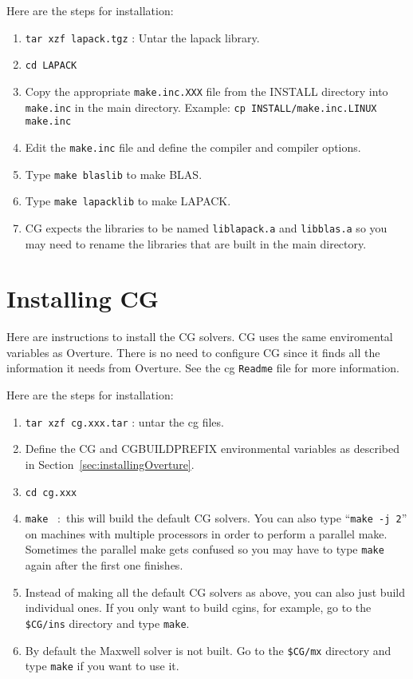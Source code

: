 \documentclass{article}
\begin{document}
\noindent Here are the steps for installation:
\begin{enumerate}
    \item {\tt tar xzf lapack.tgz} :  Untar the lapack library.
    \item {\tt cd LAPACK}
    \item Copy the appropriate {\tt make.inc.XXX} file from the INSTALL directory into
           {\tt make.inc} in the main directory. Example: {\tt cp INSTALL/make.inc.LINUX make.inc}
    \item Edit the {\tt make.inc} file and define the compiler and compiler options.
    \item Type {\tt make blaslib} to make BLAS.
    \item Type {\tt make lapacklib} to make LAPACK.
    \item CG expects the libraries to be named {\tt liblapack.a} and {\tt libblas.a}
          so you may need to rename the libraries that are built in the main directory.
\end{enumerate}

\clearpage
\section{Installing CG} \label{sec:installingCG}

Here are instructions to install the CG solvers. CG uses the same enviromental variables 
as Overture. There is no need to configure CG since it finds all the information it
needs from Overture. See the cg {\tt Readme} file for more information. 

\noindent Here are the steps for installation:
\begin{enumerate}
    \item {\tt tar xzf cg.xxx.tar} : untar the cg files. 
    \item Define the CG and CGBUILDPREFIX environmental variables as described in Section~\ref{sec:installingOverture}.
    \item {\tt cd cg.xxx} 
    \item {\tt make} ~:~this will build the default CG solvers.
                 You can also type ``{\tt make -j 2}'' on machines with multiple processors
                 in order to perform a parallel make. Sometimes the parallel make gets
                 confused so you may have to type {\tt make} again after the first one finishes.
    \item Instead of making all the default CG solvers as above, you can also just build individual ones. 
       If you only want to build cgins, for example, go to the {\tt \$CG/ins} directory and type {\tt make}. 
    \item By default the Maxwell solver is not built. Go to the {\tt \$CG/mx} directory and type {\tt make} if you
          want to use it. 
\end{enumerate}
\end{document}

